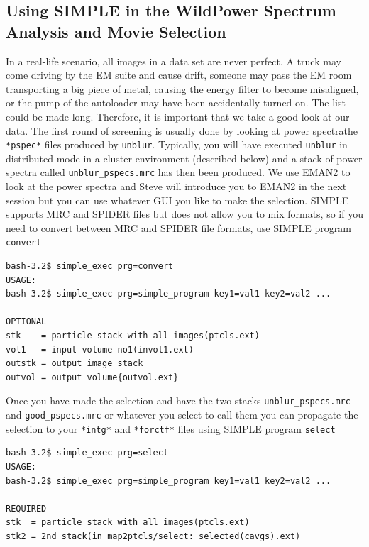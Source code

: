 \documentclass[a4paper,11pt]{article}
\newcommand{\prgname}[1]{\textcolor{NavyBlue}{\texttt{#1}}}
\begin{document}
\begin{tcolorbox}[breakable,colback=white,colframe=orange,width=\dimexpr\textwidth+12mm\relax,enlarge left by=-6mm]
\subsection{Using SIMPLE in the Wild\textemdash{}Power Spectrum Analysis and Movie Selection}
In a real-life scenario, all images in a data set are never perfect. A truck may come driving by the EM suite and cause drift, someone may pass the EM room transporting a big piece of metal, causing the energy filter to become misaligned, or the pump of the autoloader may have been accidentally turned on. The list could be made long. Therefore, it is important that we take a good look at our data. The first round of screening is usually done by looking at power spectra\textemdash{}the \texttt{*pspec*} files produced by \prgname{unblur}. Typically, you will have executed \texttt{unblur} in distributed mode in a cluster environment (described below) and a stack of power spectra called \texttt{unblur\_pspecs.mrc} has then been produced. We use EMAN2 to look at the power spectra and Steve will introduce you to EMAN2 in the next session but you can use whatever GUI you like to make the selection. SIMPLE supports MRC and SPIDER files but does not allow you to mix formats, so if you need to convert between MRC and SPIDER file formats, use SIMPLE program \prgname{convert}
\begin{verbatim}
bash-3.2$ simple_exec prg=convert
USAGE:
bash-3.2$ simple_exec prg=simple_program key1=val1 key2=val2 ...

OPTIONAL
stk    = particle stack with all images(ptcls.ext)
vol1   = input volume no1(invol1.ext)
outstk = output image stack
outvol = output volume{outvol.ext}
\end{verbatim}
Once you have made the selection and have the two stacks \texttt{unblur\_pspecs.mrc} and \texttt{good\_pspecs.mrc} or whatever you select to call them you can propagate the selection to your \texttt{*intg*} and \texttt{*forctf*} files using SIMPLE program \prgname{select}
\begin{verbatim}
bash-3.2$ simple_exec prg=select
USAGE:
bash-3.2$ simple_exec prg=simple_program key1=val1 key2=val2 ...

REQUIRED
stk  = particle stack with all images(ptcls.ext)
stk2 = 2nd stack(in map2ptcls/select: selected(cavgs).ext)


\end{verbatim}
\end{tcolorbox}
\end{document}
